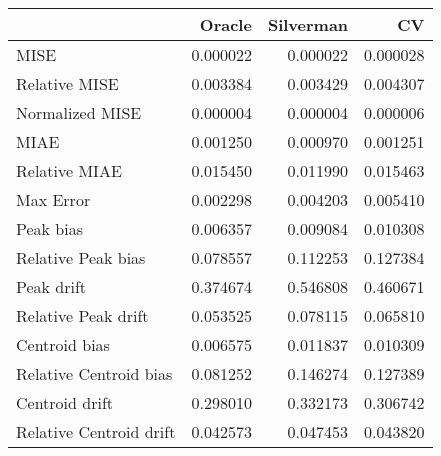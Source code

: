 \begin{tabular}{lrrr}
  \hline
 & Oracle & Silverman & CV \\ 
  \hline
MISE & 0.000022 & 0.000022 & 0.000028 \\ 
  Relative MISE & 0.003384 & 0.003429 & 0.004307 \\ 
  Normalized MISE & 0.000004 & 0.000004 & 0.000006 \\ 
  MIAE & 0.001250 & 0.000970 & 0.001251 \\ 
  Relative MIAE & 0.015450 & 0.011990 & 0.015463 \\ 
  Max Error & 0.002298 & 0.004203 & 0.005410 \\ 
  Peak bias & 0.006357 & 0.009084 & 0.010308 \\ 
  Relative Peak bias & 0.078557 & 0.112253 & 0.127384 \\ 
  Peak drift & 0.374674 & 0.546808 & 0.460671 \\ 
  Relative Peak drift & 0.053525 & 0.078115 & 0.065810 \\ 
  Centroid bias & 0.006575 & 0.011837 & 0.010309 \\ 
  Relative Centroid bias & 0.081252 & 0.146274 & 0.127389 \\ 
  Centroid drift & 0.298010 & 0.332173 & 0.306742 \\ 
  Relative Centroid drift & 0.042573 & 0.047453 & 0.043820 \\ 
   \hline
\end{tabular}
